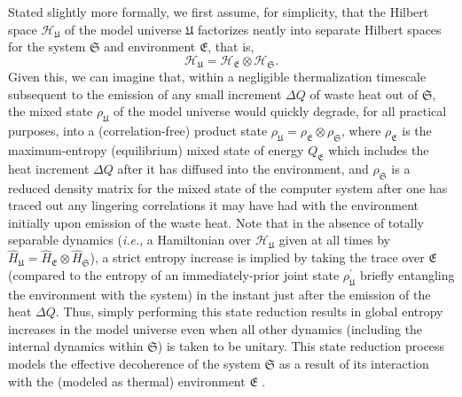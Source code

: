 \documentclass[preprints,article,accept,moreauthors,pdftex]{Definitions/mdpi}
\begin{document}
Stated slightly more formally, we first assume, for simplicity, that the Hilbert space $\mathcal{H}_\mathfrak{U}$ of the model universe $\mathfrak{U}$ factorizes neatly into separate Hilbert spaces for the system $\mathfrak{S}$ and environment $\mathfrak{E}$, that is,
\begin{equation}
    \label{eq-1}
    \mathcal{H}_\mathfrak{U} = \mathcal{H}_\mathfrak{E} \otimes \mathcal{H}_\mathfrak{S}.
\end{equation}
Given this, we can imagine that, within a negligible thermalization timescale subsequent to the emission of any small increment $\Delta Q$ of waste heat out of $\mathfrak{S}$, the mixed state $\rho_\mathfrak{U}$ of the model universe would quickly degrade, for all practical purposes, into a (correlation-free) product state $\rho_\mathfrak{U} = \rho_\mathfrak{E} \otimes \rho_\mathfrak{S}$, where $\rho_\mathfrak{E}$ is the maximum-entropy (equilibrium) mixed state of energy $Q_\mathfrak{E}$ which includes the heat increment $\Delta Q$ after it has diffused into the environment, and $\rho_\mathfrak{S}$ is a reduced density matrix for the mixed state of the computer system after one has traced out any lingering correlations it may have had with the environment initially upon emission of the waste heat. Note that in the absence of totally separable dynamics (\emph{i.e.}, a Hamiltonian over $\mathcal{H}_{\mathfrak{U}}$ given at all times by $\widehat{H}_{\mathfrak{U}} = \widehat{H}_{\mathfrak{E}}\otimes \widehat{H}_{\mathfrak{S}}$), a strict entropy increase is implied by taking the trace over $\mathfrak{E}$ (compared to the entropy of an immediately-prior joint state $\rho^\prime_\mathfrak{U}$ briefly entangling the environment with the system) in the instant just after the emission of the heat $\Delta Q$. Thus, simply performing this state reduction results in global entropy increases in the model universe even when all other dynamics (including the internal dynamics within $\mathfrak{S}$) is taken to be unitary. This state reduction process models the effective decoherence of the system $\mathfrak{S}$ as a result of its interaction with the (modeled as thermal) environment $\mathfrak{E}$ \cite{Zur03}.
\end{document}
